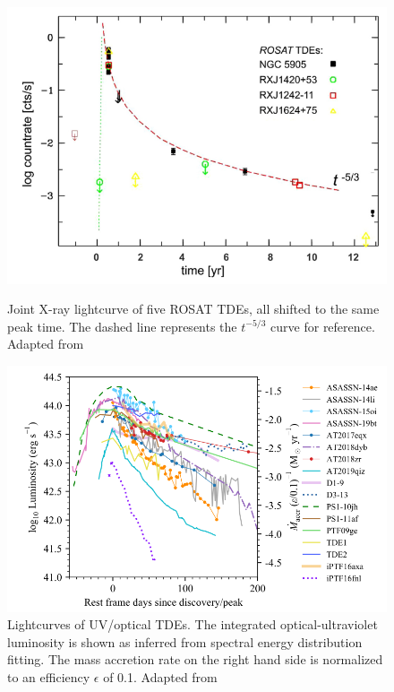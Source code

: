 \documentclass{tda}
\begin{document}
\begin{figure} 
	\begin{minipage} {.5 \textwidth}
		\captionsetup{width=.85\linewidth}
		\includegraphics[width=0.9\linewidth]{./images/komossa2015.png}
		\caption{Joint X-ray lightcurve of five ROSAT TDEs, all shifted to the same peak time. The dashed line represents the \(t^{-5/3}\) curve for reference. Adapted from \cite{komossa_tidal_2015}}
		\label{fig:xray_luminosity}
	\end{minipage}%
	\begin{minipage} {.5 \textwidth}
		\captionsetup{width=.85\linewidth}
		\includegraphics[width=\linewidth]{./images/vanvelzen2020.png}
		\caption{Lightcurves of UV/optical TDEs. The integrated optical-ultraviolet luminosity is shown as inferred
from spectral energy distribution fitting. The mass accretion rate on the right hand side is normalized to an efficiency \(\epsilon\) of 0.1. Adapted from \cite{van_velzen_optical-ultraviolet_2020}}
		\label{fig:optical UV_luminosity}
	\end{minipage}
\end{figure}
\end{document}
